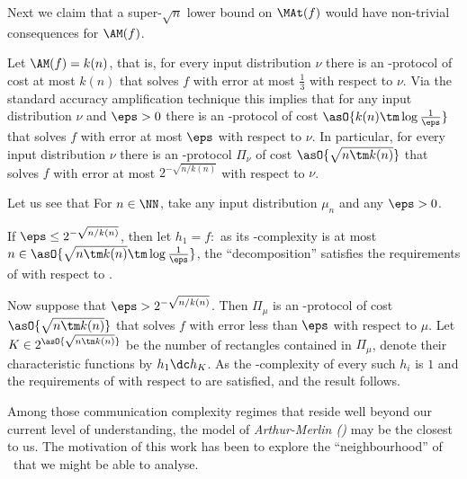 Next we claim that a super-$\sqrt n$ lower bound on $\MAt(f)$ would have non-trivial consequences for $\AM(f)$.


Let $\AM(f)=k(n)$, that is, for every input distribution $\nu$ there is an \NP-protocol of cost at most $k(n)$ that solves $f$ with error at most $\frac13$ with respect to $\nu$.
Via the standard accuracy amplification technique this implies that for any input distribution $\nu$ and $\eps>0$ there is an \NP-protocol of cost $\asO{k(n)\tm\log\frac1\eps}$ that solves $f$ with error at most $\eps$ with respect to $\nu$.
In particular, for every input distribution $\nu$ there is an \NP-protocol $\Pi_\nu$ of cost $\asO{\sqrt{n\tm k(n)}}$ that solves $f$ with error at most $2^{-\sqrt{n/{k(n)}}}$ with respect to $\nu$.

Let us see that
For $n\in\NN$, take any input distribution $\mu_n$ and any $\eps>0$.

If $\eps\le2^{-\sqrt{n/{k(n)}}}$, then let $h_1=f$:\ as its \Pp-complexity is at most $n\in\asO{\sqrt{n\tm k(n)}\tm\log\frac1\eps}$, the ``decomposition''
satisfies the requirements of  with respect to .

Now suppose that $\eps>2^{-\sqrt{n/{k(n)}}}$.
Then $\Pi_\mu$ is an \NP-protocol of cost $\asO{\sqrt{n\tm k(n)}}$ that solves $f$ with error less than $\eps$ with respect to $\mu$.
Let $K\in2^{\asO{\sqrt{n\tm k(n)}}}$ be the number of rectangles contained in $\Pi_\mu$, denote their characteristic functions by $h_1\dc h_K$.
As the \Pp-complexity of every such $h_i$ is $1$ and
the requirements of  with respect to  are satisfied, and the result follows.
\prfend


Among those communication complexity regimes that reside well beyond our current level of understanding, the model of \emph{Arthur-Merlin (\AM)} may be the closest to us.
The motivation of this work has been to explore the ``neighbourhood'' of \AM\ that we might be able to analyse.


